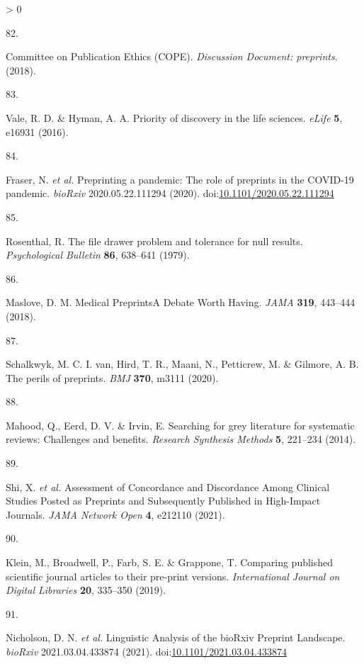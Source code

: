 \documentclass[a4paper, twoside]{templates/ociamthesis}
\newlength{\cslhangindent}
\newlength{\csllabelwidth}
\newenvironment{CSLReferences}[3] %
 {%
  \setlength{\parindent}{0pt}
  \ifodd #1 \everypar{\setlength{\hangindent}{\cslhangindent}}\ignorespaces\fi
  \ifnum #2 > 0
  \setlength{\parskip}{#2\baselineskip}
  \fi
 }%
 {}
\newcommand{\CSLLeftMargin}[1]{\parbox[t]{\maxof{\widthof{#1}}{\csllabelwidth}}{#1}}
\newcommand{\CSLRightInline}[1]{\parbox[t]{\linewidth - \csllabelwidth}{#1}}
\begin{document}
\begin{CSLReferences}{0}{0}
\leavevmode\hypertarget{ref-committeeonpublicationethicscope2018}{}%
\CSLLeftMargin{82. }
\CSLRightInline{Committee on Publication Ethics (COPE). \emph{Discussion {Document}: preprints}. (2018).}

\leavevmode\hypertarget{ref-vale2016}{}%
\CSLLeftMargin{83. }
\CSLRightInline{Vale, R. D. \& Hyman, A. A. Priority of discovery in the life sciences. \emph{eLife} \textbf{5}, e16931 (2016).}

\leavevmode\hypertarget{ref-fraser2020preprinting}{}%
\CSLLeftMargin{84. }
\CSLRightInline{Fraser, N. \emph{et al.} Preprinting a pandemic: The role of preprints in the {COVID}-19 pandemic. \emph{bioRxiv} 2020.05.22.111294 (2020). doi:\href{https://doi.org/10.1101/2020.05.22.111294}{10.1101/2020.05.22.111294}}

\leavevmode\hypertarget{ref-rosenthal1979}{}%
\CSLLeftMargin{85. }
\CSLRightInline{Rosenthal, R. The file drawer problem and tolerance for null results. \emph{Psychological Bulletin} \textbf{86}, 638--641 (1979).}

\leavevmode\hypertarget{ref-maslove2018}{}%
\CSLLeftMargin{86. }
\CSLRightInline{Maslove, D. M. Medical {Preprints}{{A Debate Worth Having}}. \emph{JAMA} \textbf{319}, 443--444 (2018).}

\leavevmode\hypertarget{ref-schalkwyk2020}{}%
\CSLLeftMargin{87. }
\CSLRightInline{Schalkwyk, M. C. I. van, Hird, T. R., Maani, N., Petticrew, M. \& Gilmore, A. B. The perils of preprints. \emph{BMJ} \textbf{370}, m3111 (2020).}

\leavevmode\hypertarget{ref-mahood2014}{}%
\CSLLeftMargin{88. }
\CSLRightInline{Mahood, Q., Eerd, D. V. \& Irvin, E. Searching for grey literature for systematic reviews: Challenges and benefits. \emph{Research Synthesis Methods} \textbf{5}, 221--234 (2014).}

\leavevmode\hypertarget{ref-shi2021}{}%
\CSLLeftMargin{89. }
\CSLRightInline{Shi, X. \emph{et al.} Assessment of {Concordance} and {Discordance Among Clinical Studies Posted} as {Preprints} and {Subsequently Published} in {High}-{Impact Journals}. \emph{JAMA Network Open} \textbf{4}, e212110 (2021).}

\leavevmode\hypertarget{ref-klein2019}{}%
\CSLLeftMargin{90. }
\CSLRightInline{Klein, M., Broadwell, P., Farb, S. E. \& Grappone, T. Comparing published scientific journal articles to their pre-print versions. \emph{International Journal on Digital Libraries} \textbf{20}, 335--350 (2019).}

\leavevmode\hypertarget{ref-nicholson2021}{}%
\CSLLeftMargin{91. }
\CSLRightInline{Nicholson, D. N. \emph{et al.} Linguistic {Analysis} of the {bioRxiv Preprint Landscape}. \emph{bioRxiv} 2021.03.04.433874 (2021). doi:\href{https://doi.org/10.1101/2021.03.04.433874}{10.1101/2021.03.04.433874}}


\end{CSLReferences}
\end{document}
